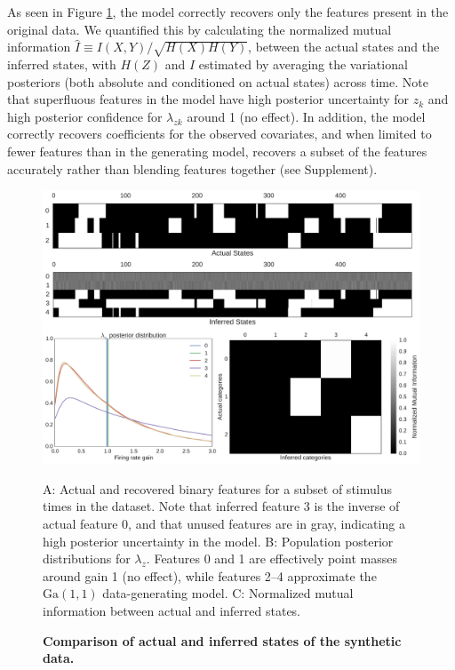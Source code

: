 \documentclass[10pt,letterpaper]{article}
\begin{document}
As seen in Figure \ref{synthetic}, the model correctly recovers only the features present in the original data. We quantified this by calculating the normalized mutual information $\hat{I}\equiv I(X, Y)/\sqrt{H(X)H(Y)}$, between the actual states and the inferred states, with $H(Z)$ and $I$ estimated by averaging the variational posteriors (both absolute and conditioned on actual states) across time. Note that superfluous features in the model have high posterior uncertainty for $z_k$ and high posterior confidence for $\lambda_{zk}$ around 1 (no effect). In addition, the model correctly recovers coefficients for the observed covariates, and when limited to fewer features than in the generating model, recovers a subset of the features accurately rather than blending features together (see Supplement).

\begin{figure}[!h]
    \center
    \includegraphics[width=\linewidth]{figures/synthetic}
	\caption{\bf Comparison of actual and inferred states of the synthetic data.}
	A: Actual and recovered binary features for a subset of stimulus times in the dataset. Note that inferred feature 3 is the inverse of actual feature 0, and that unused features are in gray, indicating a high posterior uncertainty in the model. B: Population posterior distributions for $\lambda_z$. Features 0 and 1 are effectively point masses around gain 1 (no effect), while features 2--4 approximate the $\text{Ga}(1, 1)$ data-generating model. C: Normalized mutual information between actual and inferred states.
	\label{synthetic}
\end{figure}
\end{document}
